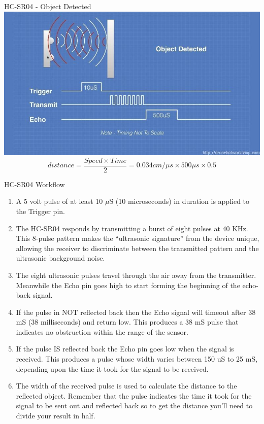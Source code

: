\documentclass[12pt,letterpaper]{beamer}
\begin{document}
\begin{frame}{HC-SR04 - Object Detected}
    \includegraphics[width=.95\linewidth]{object_detect}
    \begin{equation*}
        distance = \frac{Speed \times Time}{2} = 0.034cm/{\mu}s \times 500{\mu}s \times 0.5
    \end{equation*}
\end{frame}

\begin{frame}{HC-SR04 Workflow}

    {\scriptsize
        \begin{enumerate}
            \item A 5 volt pulse of at least 10 $\mu$S (10 microseconds) in duration is applied to the Trigger pin.
            \item The HC-SR04 responds by transmitting a burst of eight pulses at 40 KHz. This 8-pulse pattern makes the “ultrasonic signature” from the device unique, allowing the receiver to discriminate between the transmitted pattern and the ultrasonic background noise.
            \item The eight ultrasonic pulses travel through the air away from the transmitter. Meanwhile the Echo pin goes high to start forming the beginning of the echo-back signal.
            \item If the pulse in NOT reflected back then the Echo signal will timeout after 38 mS (38 milliseconds) and return low. This produces a 38 mS pulse that indicates no obstruction within the range of the sensor.
            \item If the pulse IS reflected back the Echo pin goes low when the signal is received.  This produces a pulse whose width varies between 150 uS to 25 mS, depending upon the time it took for the signal to be received.
            \item The width of the received pulse is used to calculate the distance to the reflected object. Remember that the pulse indicates the time it took for the signal to be sent out and reflected back so to get the distance you’ll need to divide your result in half.
        \end{enumerate}
    }
\end{frame}
\end{document}
